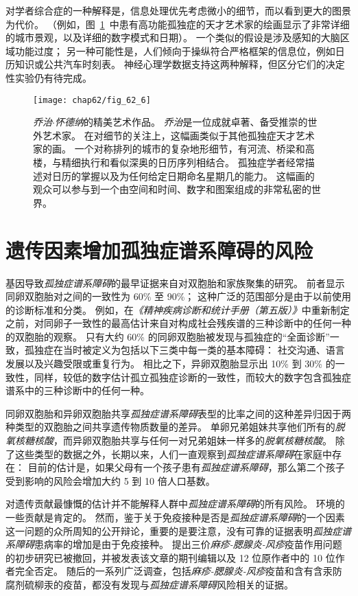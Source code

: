对学者综合症的一种解释是，信息处理优先考虑微小的细节，而以看到更大的图景为代价。
（例如，图~\ref{fig:62_6}~中患有高功能孤独症的天才艺术家的绘画显示了非常详细的城市景观，以及详细的数字模式和日期）。
一个类似的假设是涉及感知的大脑区域功能过度；
另一种可能性是，人们倾向于操纵符合严格框架的信息位，例如日历知识或公共汽车时刻表。
神经心理学数据支持这两种解释，但区分它们的决定性实验仍有待完成。


\begin{figure}[htbp]
	\centering
	\texttt{[image: chap62/fig\_62\_6]}
	\caption{\textit{乔治$\cdot$怀德纳}的精美艺术作品。
		\textit{乔治}是一位成就卓著、备受推崇的世外艺术家。
		在对细节的关注上，这幅画类似于其他孤独症天才艺术家的画。
		一个对称排列的城市的复杂地形细节，有河流、桥梁和高楼，与精细执行和看似深奥的日历序列相结合。
		孤独症学者经常描述对日历的掌握以及为任何给定日期命名星期几的能力。
		这幅画的观众可以参与到一个由空间和时间、数字和图案组成的非常私密的世界。}
	\label{fig:62_6}
\end{figure}



\section{遗传因素增加孤独症谱系障碍的风险}

基因导致\textit{孤独症谱系障碍}的最早证据来自对双胞胎和家族聚集的研究。
前者显示同卵双胞胎对之间的一致性为 60\% 至 90\%；
这种广泛的范围部分是由于以前使用的诊断标准和分类。
例如，在\textit{《精神疾病诊断和统计手册（第五版）》}中重新制定之前，对同卵子一致性的最高估计来自对构成社会残疾谱的三种诊断中的任何一种的双胞胎的观察。
只有大约 60\% 的同卵双胞胎被发现与孤独症的“全面诊断”一致，孤独症在当时被定义为包括以下三类中每一类的基本障碍：
社交沟通、语言发展以及兴趣受限或重复行为。
相比之下，异卵双胞胎显示出 10\% 到 30\% 的一致性，同样，较低的数字估计孤立孤独症诊断的一致性，而较大的数字包含孤独症谱系中的三种诊断中的任何一种。


同卵双胞胎和异卵双胞胎共享\textit{孤独症谱系障碍}表型的比率之间的这种差异归因于两种类型的双胞胎之间共享遗传物质数量的差异。
单卵兄弟姐妹共享他们所有的\textit{脱氧核糖核酸}，而异卵双胞胎共享与任何一对兄弟姐妹一样多的\textit{脱氧核糖核酸}。
除了这些类型的数据之外，长期以来，人们一直观察到\textit{孤独症谱系障碍}在家庭中存在：
目前的估计是，如果父母有一个孩子患有\textit{孤独症谱系障碍}，那么第二个孩子受到影响的风险会增加大约 5 到 10 倍人口基数。


对遗传贡献最慷慨的估计并不能解释人群中\textit{孤独症谱系障碍}的所有风险。
环境的一些贡献是肯定的。
然而，鉴于关于免疫接种是否是\textit{孤独症谱系障碍}的一个因素这一问题的众所周知的公开辩论，重要的是要注意，没有可靠的证据表明\textit{孤独症谱系障碍}患病率的增加是由于免疫接种。
提出三价\textit{麻疹-腮腺炎-风疹}疫苗作用问题的初步研究已被撤回，并被发表该文章的期刊编辑以及 12 位原作者中的 10 位作者完全否定。
随后的一系列广泛调查，包括\textit{麻疹-腮腺炎-风疹}疫苗和含有含汞防腐剂硫柳汞的疫苗，都没有发现与\textit{孤独症谱系障碍}风险相关的证据。


